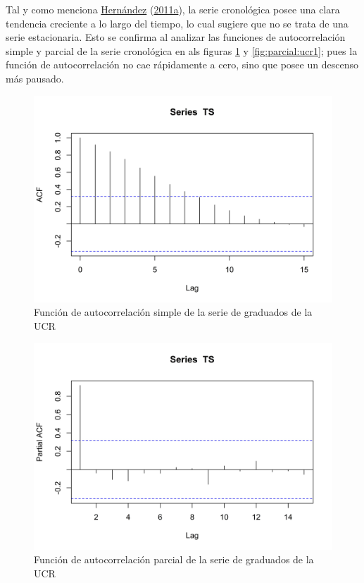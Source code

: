 \documentclass[
]{article}
\begin{document}
Tal y como menciona \protect\hyperlink{ref-oscarh-1}{Hernández}
(\protect\hyperlink{ref-oscarh-1}{2011a}), la serie cronológica posee
una clara tendencia creciente a lo largo del tiempo, lo cual sugiere que
no se trata de una serie estacionaria. Esto se confirma al analizar las
funciones de autocorrelación simple y parcial de la serie cronológica en
als figuras \ref{fig:auto_ucr1} y \ref{fig:parcial:ucr1}; pues la
función de autocorrelación no cae rápidamente a cero, sino que posee un
descenso más pausado.

\begin{figure}[!h]
\includegraphics[width=1\linewidth,height=1\textheight]{Tesis_files/figure-latex/auto_ucr1-1} \caption{Función de autocorrelación simple de la serie de graduados de la UCR}\label{fig:auto_ucr1}
\end{figure}

\begin{figure}[!h]
\includegraphics[width=1\linewidth,height=1\textheight]{Tesis_files/figure-latex/parcial_ucr1-1} \caption{Función de autocorrelación parcial de la serie de graduados de la UCR}\label{fig:parcial_ucr1}
\end{figure}
\end{document}
